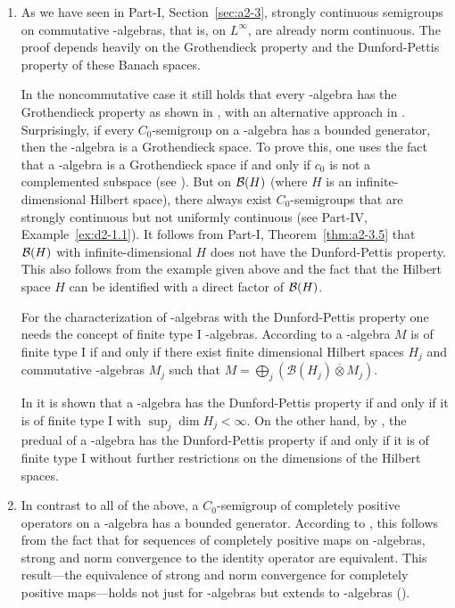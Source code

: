 \begin{enumerate}
\item
As we have seen in Part-I, Section~\ref{sec:a2-3}, strongly continuous semigroups on commutative \WA-algebras, that is, on $L^{\infty}$, are already norm continuous. 
The proof depends heavily on the Grothendieck property and the Dunford-Pettis property of these Banach spaces.

In the noncommutative case it still holds that every \WA-algebra has the Grothendieck property as shown in \textcite{zbmath00537321}, with an alternative approach in \textcite{zbmath00125315}.
Surprisingly, if every $C_{0}$-semigroup on a \CA-algebra has a bounded generator, then the \CA-algebra is a Grothendieck space.
To prove this, one uses the fact that a \CA-algebra is a Grothendieck space if and only if $c_{0}$ is not a complemented subspace (see 
\textcite[Proposition 3.1.13 and Proposition 4.2.1]{zbmath07458830}).
But on $\mathcal{B}(H)$ (where $H$ is an infinite-dimensional Hilbert space), there always exist $C_{0}$-semigroups that are strongly continuous but not uniformly continuous (see Part-IV, Example~\ref{ex:d2-1.1}). 
It follows from Part-I, Theorem~\ref{thm:a2-3.5} that $\mathcal{B}(H)$ with infinite-dimensional $H$ 
does not have the Dunford-Pettis property. 
This also follows from the example given above and the fact that the Hilbert space $H$ can be identified with a direct factor of $\mathcal{B}(H)$.

For the characterization of \WA-algebras with the Dunford-Pettis property one needs the  concept of finite type I \WA-algebras.
According to \textcite[Theorem V.1.27]{zbmath01692441} a \WA-algebra  $M$ is of finite type I if and only if there exist finite dimensional Hilbert spaces $H_{j}$ and commutative \WA-algebras $M_{j}$ such that 
$ M = \bigoplus_{j} ( \mathcal{B}(H_{j}) \overline{\otimes} M_{j} )$.

In \textcite{zbmath00125315} it is shown that a \WA-algebra has the Dunford-Pettis property if and only if it is of finite type I with $\sup_{j} \dim H_{j} < \infty$.
On the other hand, by \textcite{zbmath00097659}, the predual of a \WA-algebra has the Dunford-Pettis property if and only if it is of finite type I without further restrictions on the dimensions of the Hilbert spaces.

\item 
In contrast to all of the above, a $C_{0}$-semigroup of completely positive operators on a \WA-algebra has a bounded generator. 
According to \textcite{zbmath01495754}, this follows from the fact that for sequences of completely positive maps on \WA-algebras, strong and norm convergence to the identity operator are equivalent. 
This result---the equivalence of strong and norm convergence 
for completely positive maps---holds not just for \WA-algebras 
but extends to \AW-algebras (\textcite{zbmath01495754}).
\end{enumerate}
